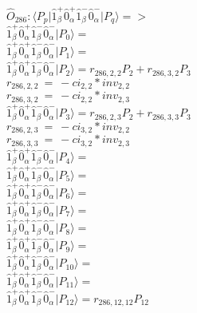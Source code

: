 \documentclass[14pt]{article}
\begin{document}
    $\hat{O}_{286}:  \langle{P_p}\vert \hat{1}_{\beta}^{+}\hat{0}_{\alpha}^{+}\hat{1}_{\beta}^{-}\hat{0}_{\alpha}^{-} \vert{P_q}\rangle => $ \\ 
    $ \hat{1}_{\beta}^{+}\hat{0}_{\alpha}^{+}\hat{1}_{\beta}^{-}\hat{0}_{\alpha}^{-} \vert{P_{0}}\rangle =  $ \\ 
    $ \hat{1}_{\beta}^{+}\hat{0}_{\alpha}^{+}\hat{1}_{\beta}^{-}\hat{0}_{\alpha}^{-} \vert{P_{1}}\rangle =  $ \\ 
    $ \hat{1}_{\beta}^{+}\hat{0}_{\alpha}^{+}\hat{1}_{\beta}^{-}\hat{0}_{\alpha}^{-} \vert{P_{2}}\rangle = {r}_{286,2,2}P_{2}+{r}_{286,3,2}P_{3} $ \\ 
    ${r}_{286,2,2}\ =\ -{ci}_{2,2}*{inv}_{2,2} $ \\ 
    ${r}_{286,3,2}\ =\ -{ci}_{2,2}*{inv}_{2,3} $ \\ 
    $ \hat{1}_{\beta}^{+}\hat{0}_{\alpha}^{+}\hat{1}_{\beta}^{-}\hat{0}_{\alpha}^{-} \vert{P_{3}}\rangle = {r}_{286,2,3}P_{2}+{r}_{286,3,3}P_{3} $ \\ 
    ${r}_{286,2,3}\ =\ -{ci}_{3,2}*{inv}_{2,2} $ \\ 
    ${r}_{286,3,3}\ =\ -{ci}_{3,2}*{inv}_{2,3} $ \\ 
    $ \hat{1}_{\beta}^{+}\hat{0}_{\alpha}^{+}\hat{1}_{\beta}^{-}\hat{0}_{\alpha}^{-} \vert{P_{4}}\rangle =  $ \\ 
    $ \hat{1}_{\beta}^{+}\hat{0}_{\alpha}^{+}\hat{1}_{\beta}^{-}\hat{0}_{\alpha}^{-} \vert{P_{5}}\rangle =  $ \\ 
    $ \hat{1}_{\beta}^{+}\hat{0}_{\alpha}^{+}\hat{1}_{\beta}^{-}\hat{0}_{\alpha}^{-} \vert{P_{6}}\rangle =  $ \\ 
    $ \hat{1}_{\beta}^{+}\hat{0}_{\alpha}^{+}\hat{1}_{\beta}^{-}\hat{0}_{\alpha}^{-} \vert{P_{7}}\rangle =  $ \\ 
    $ \hat{1}_{\beta}^{+}\hat{0}_{\alpha}^{+}\hat{1}_{\beta}^{-}\hat{0}_{\alpha}^{-} \vert{P_{8}}\rangle =  $ \\ 
    $ \hat{1}_{\beta}^{+}\hat{0}_{\alpha}^{+}\hat{1}_{\beta}^{-}\hat{0}_{\alpha}^{-} \vert{P_{9}}\rangle =  $ \\ 
    $ \hat{1}_{\beta}^{+}\hat{0}_{\alpha}^{+}\hat{1}_{\beta}^{-}\hat{0}_{\alpha}^{-} \vert{P_{10}}\rangle =  $ \\ 
    $ \hat{1}_{\beta}^{+}\hat{0}_{\alpha}^{+}\hat{1}_{\beta}^{-}\hat{0}_{\alpha}^{-} \vert{P_{11}}\rangle =  $ \\ 
    $ \hat{1}_{\beta}^{+}\hat{0}_{\alpha}^{+}\hat{1}_{\beta}^{-}\hat{0}_{\alpha}^{-} \vert{P_{12}}\rangle = {r}_{286,12,12}P_{12} $ \\ 
\end{document}
